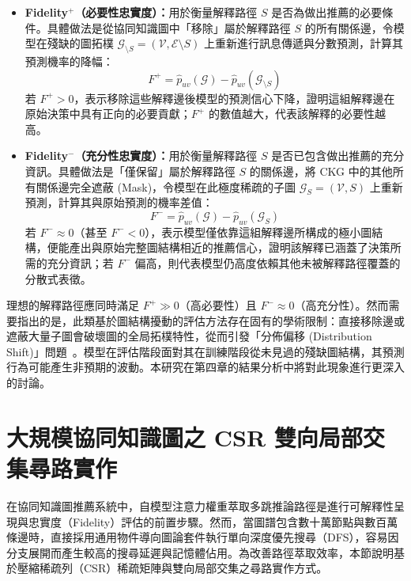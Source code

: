 \begin{itemize}[leftmargin=2em]
  \item \textbf{Fidelity$^+$（必要性忠實度）：}用於衡量解釋路徑 $S$ 是否為做出推薦的必要條件。具體做法是從協同知識圖中「移除」屬於解釋路徑 $S$ 的所有關係邊，令模型在殘缺的圖拓樸 $\mathcal{G}_{\setminus S} = (\mathcal{V}, \mathcal{E} \setminus S)$ 上重新進行訊息傳遞與分數預測，計算其預測機率的降幅：
    \begin{equation}
      F^+ = \hat{p}_{uv}(\mathcal{G}) - \hat{p}_{uv}(\mathcal{G}_{\setminus S})
      \label{eq:fidelity_plus}
    \end{equation}
    若 $F^+ > 0$，表示移除這些解釋邊後模型的預測信心下降，證明這組解釋邊在原始決策中具有正向的必要貢獻；$F^+$ 的數值越大，代表該解釋的必要性越高。

  \item \textbf{Fidelity$^-$（充分性忠實度）：}用於衡量解釋路徑 $S$ 是否已包含做出推薦的充分資訊。具體做法是「僅保留」屬於解釋路徑 $S$ 的關係邊，將 CKG 中的其他所有關係邊完全遮蔽 (Mask)，令模型在此極度稀疏的子圖 $\mathcal{G}_S = (\mathcal{V}, S)$ 上重新預測，計算其與原始預測的機率差值：
    \begin{equation}
      F^- = \hat{p}_{uv}(\mathcal{G}) - \hat{p}_{uv}(\mathcal{G}_S)
      \label{eq:fidelity_minus}
    \end{equation}
    若 $F^- \approx 0$（甚至 $F^- < 0$），表示模型僅依靠這組解釋邊所構成的極小圖結構，便能產出與原始完整圖結構相近的推薦信心，證明該解釋已涵蓋了決策所需的充分資訊；若 $F^-$ 偏高，則代表模型仍高度依賴其他未被解釋路徑覆蓋的分散式表徵。
\end{itemize}

理想的解釋路徑應同時滿足 $F^+ \gg 0$（高必要性）且 $F^- \approx 0$（高充分性）。然而需要指出的是，此類基於圖結構擾動的評估方法存在固有的學術限制：直接移除邊或遮蔽大量子圖會破壞圖的全局拓樸特性，從而引發「分佈偏移 (Distribution Shift)」問題~\cite{agarwal2024fidelity}。模型在評估階段面對其在訓練階段從未見過的殘缺圖結構，其預測行為可能產生非預期的波動。本研究在第四章的結果分析中將對此現象進行更深入的討論。

\section{大規模協同知識圖之 CSR 雙向局部交集尋路實作}\label{sec:csr_architecture}

在協同知識圖推薦系統中，自模型注意力權重萃取多跳推論路徑是進行可解釋性呈現與忠實度（Fidelity）評估的前置步驟。然而，當圖譜包含數十萬節點與數百萬條邊時，直接採用通用物件導向圖論套件執行單向深度優先搜尋（DFS），容易因分支展開而產生較高的搜尋延遲與記憶體佔用。為改善路徑萃取效率，本節說明基於壓縮稀疏列（CSR）稀疏矩陣與雙向局部交集之尋路實作方式。

